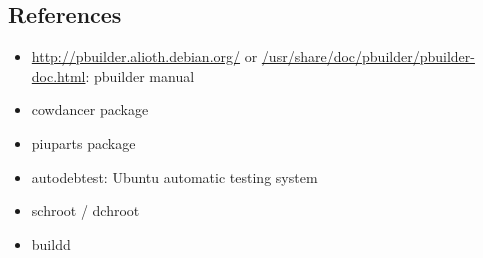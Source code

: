 \documentclass[a4paper]{article}
\begin{document}
\subsection{References}

\begin{itemize}
 \item \url{http://pbuilder.alioth.debian.org/} or
 \url{/usr/share/doc/pbuilder/pbuilder-doc.html}: pbuilder manual
 \item cowdancer package
 \item piuparts package
 \item autodebtest: Ubuntu automatic testing system
 \item schroot / dchroot 
 \item buildd
\end{itemize}
\end{document}
